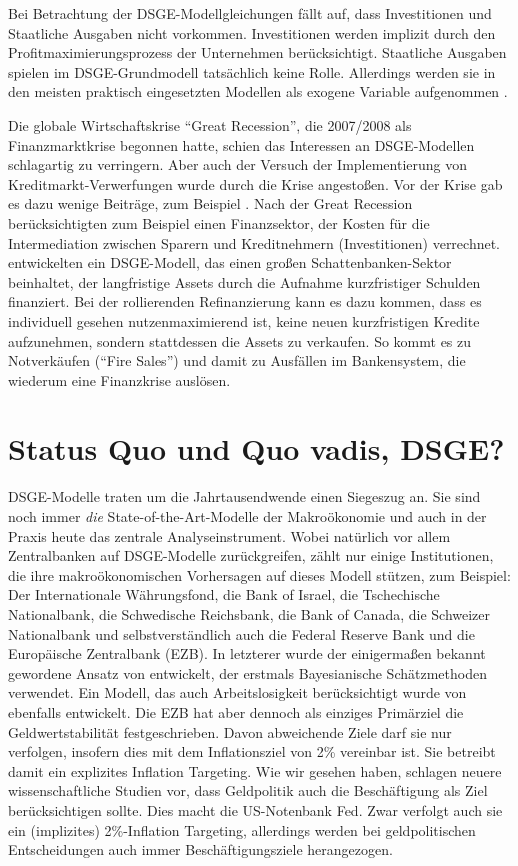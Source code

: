 Bei Betrachtung der DSGE-Modellgleichungen fällt auf, dass Investitionen und Staatliche Ausgaben nicht vorkommen. Investitionen werden implizit durch den Profitmaximierungsprozess der Unternehmen berücksichtigt. Staatliche Ausgaben spielen im DSGE-Grundmodell tatsächlich keine Rolle. Allerdings werden sie in den meisten praktisch eingesetzten Modellen als exogene Variable aufgenommen \parencite[S. 361]{Romer2015}.

Die globale Wirtschaftskrise "`Great Recession"', die 2007/2008 als Finanzmarktkrise begonnen hatte, schien das Interessen an DSGE-Modellen schlagartig zu verringern. Aber auch der Versuch der Implementierung von Kreditmarkt-Verwerfungen wurde durch die Krise angestoßen. Vor der Krise gab es dazu wenige Beiträge, zum Beispiel \textcite{Gertler2015}. Nach der Great Recession berücksichtigten zum Beispiel \textcite{Curdia2016} einen Finanzsektor, der Kosten für die Intermediation zwischen Sparern und Kreditnehmern (Investitionen) verrechnet. \textcite{Gertler2015} entwickelten ein DSGE-Modell, das einen großen Schattenbanken-Sektor beinhaltet, der langfristige Assets durch die Aufnahme kurzfristiger Schulden finanziert. Bei der rollierenden Refinanzierung kann es dazu kommen, dass es individuell gesehen nutzenmaximierend ist, keine neuen kurzfristigen Kredite aufzunehmen, sondern stattdessen die Assets zu verkaufen. So kommt es zu Notverkäufen ("`Fire Sales"') und damit zu Ausfällen im Bankensystem, die wiederum eine Finanzkrise auslösen.


\section{Status Quo und Quo vadis, DSGE?}

DSGE-Modelle traten um die Jahrtausendwende einen Siegeszug an. Sie sind noch immer \textit{die} State-of-the-Art-Modelle der Makroökonomie und auch in der Praxis heute das zentrale Analyseinstrument. Wobei natürlich vor allem Zentralbanken auf DSGE-Modelle zurückgreifen, \textcite[S. 132]{Christiano2018} zählt nur einige Institutionen, die ihre makroökonomischen Vorhersagen auf dieses Modell stützen, zum Beispiel: Der Internationale Währungsfond, die Bank of Israel, die Tschechische Nationalbank, die Schwedische Reichsbank, die Bank of Canada, die Schweizer Nationalbank und selbstverständlich auch die Federal Reserve Bank und die Europäische Zentralbank (EZB). In letzterer wurde der einigermaßen bekannt gewordene Ansatz von \textcite{SmetsWouters2003, SmetsWouters2007} entwickelt, der erstmals Bayesianische Schätzmethoden verwendet. Ein Modell, das auch Arbeitslosigkeit berücksichtigt wurde von \textcite{GaliSmetsWouters2012} ebenfalls entwickelt. Die EZB hat aber dennoch als einziges Primärziel die Geldwertstabilität festgeschrieben. Davon abweichende Ziele darf sie nur verfolgen, insofern dies mit dem Inflationsziel von 2\% vereinbar ist. Sie betreibt damit ein explizites Inflation Targeting. Wie wir gesehen haben, schlagen neuere wissenschaftliche Studien vor, dass Geldpolitik auch die Beschäftigung als Ziel berücksichtigen sollte. Dies macht die US-Notenbank Fed. Zwar verfolgt auch sie ein (implizites) 2\%-Inflation Targeting, allerdings werden bei geldpolitischen Entscheidungen auch immer Beschäftigungsziele herangezogen. 

